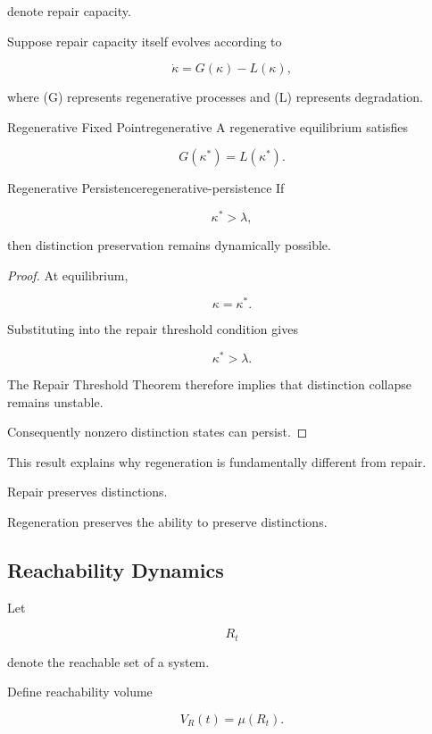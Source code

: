 \documentclass[12pt,twoside,openright]{book}
\begin{document}
denote repair capacity.

Suppose repair capacity itself evolves according to

\[
\dot\kappa
=

G(\kappa)-L(\kappa),
\]

where (G) represents regenerative processes and (L)
represents degradation.

\begin{definition}{Regenerative Fixed Point}{regenerative}
A regenerative equilibrium satisfies

\[
G(\kappa^*)
=

L(\kappa^*).
\]
\end{definition}

\begin{theorem}{Regenerative Persistence}{regenerative-persistence}
If

\[
\kappa^*>\lambda,
\]

then distinction preservation remains dynamically
possible.
\end{theorem}

\begin{proof}
At equilibrium,

\[
\kappa=\kappa^*.
\]

Substituting into the repair threshold condition gives

\[
\kappa^*>\lambda.
\]

The Repair Threshold Theorem therefore implies that
distinction collapse remains unstable.

Consequently nonzero distinction states can persist.
\end{proof}

This result explains why regeneration is fundamentally
different from repair.

Repair preserves distinctions.

Regeneration preserves the ability to preserve
distinctions.

\subsection{Reachability Dynamics}

Let

\[
R_t
\]

denote the reachable set of a system.

Define reachability volume

\[
V_R(t)
=

\mu(R_t).
\]
\end{document}
